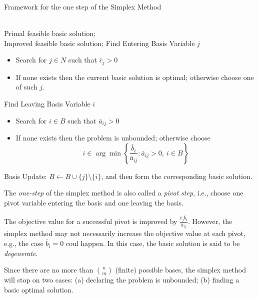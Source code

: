 \begin{algorithm}[htb] 
\caption{Framework for the one step of the Simplex Method} 
\label{alg:SM} 
\begin{algorithmic}[1] %
\REQUIRE ~~\\ %
Primal feasible basic solution;
\ENSURE ~~\\ %
Improved feasible basic solution;
\STATE Find Entering Basis Variable $j$
\begin{itemize}
\item
Search for $j\in N$ such that $\bar{c}_j>0$
\item
If none exists then the current basic solution is optimal; otherwise choose one of such $j$.
\end{itemize}
\STATE Find Leaving Basis Variable $i$
\begin{itemize}
\item
Search for $i\in B$ such that $\bar{a}_{ij}>0$
\item
If none exists then the problem is unbounded; otherwise choose
\[
i\in\arg\min\left\{\frac{\bar{b}_i}{\bar{a}_{ij}}: \bar{a}_{ij}>0,\ i\in B
\right\}
\]
\end{itemize}
\label{code:fram:trainbase}
\STATE Basis Update:  $B\leftarrow B\cup\{j\}\setminus\{i\}$, and then form the corresponding basic solution.
\end{algorithmic}
\end{algorithm}
\begin{remark}
The \emph{one-step} of the simplex method is also called a \emph{pivot step}, i.e., choose one pivot variable entering the basis and one leaving the basis.

The objective value for a successful pivot is improved by $\frac{\bar{c}_j\bar{b}_i}{\bar{a}_{ij}}$. However, the simplex method may not necessarily increase the objective value at each pivot, e.g., the case $\bar{b}_i=0$ coul happen. In this case, the basic solution is said to be \emph{degenerate}.

Since there are no more than $\binom{n}{m}$ (finite) possible bases, the simplex method will stop on two cases: (a) declaring the problem is unbounded; (b) finding a basic optimal solution.
\end{remark}
